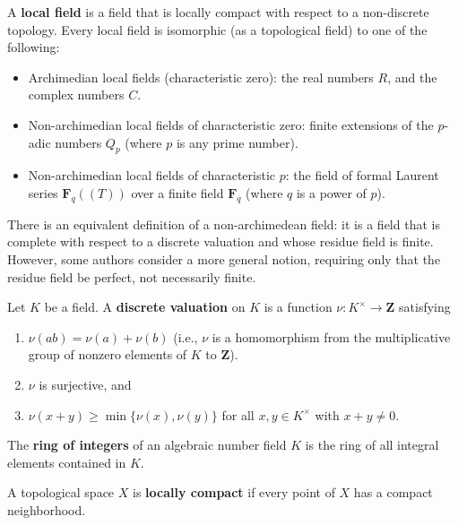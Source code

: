 \documentclass[11pt]{article}
\newenvironment{definition}[1][Definition]{\begin{trivlist}
\item[\hskip \labelsep {\bfseries #1}]}{\end{trivlist}}
\begin{document}
	
\begin{definition}
A \textbf{local field} is a field that is locally compact with respect to a non-discrete topology.
Every local field is isomorphic (as a topological field) to one of the following:
\begin{itemize}
	\item Archimedian local fields (characteristic zero): the real numbers $R$, and the complex numbers $C$.
	\item Non-archimedian local fields of characteristic zero: finite extensions of the $p$-adic numbers $Q_p$ (where $p$ is any prime number).
	\item Non-archimedian local fields of characteristic $p$: the field of formal Laurent series $\mathbf{F}_q((T))$ over a finite field $\mathbf{F}_q$
	(where $q$ is a power of $p$).
\end{itemize}
There is an equivalent definition of a non-archimedean field: it is a field that is complete with respect to a discrete valuation	 and whose residue field is finite.
However, some authors consider a more general notion, requiring only that the residue field be perfect, not necessarily finite.
\end{definition}

\begin{definition}
Let $K$ be a field. A \textbf{discrete valuation} on $K$ is a function $\nu: K^\times \to \mathbf{Z}$ satisfying
\begin{enumerate}
\item $\nu(ab) = \nu(a) + \nu(b)$ (i.e., $\nu$ is a homomorphism from the multiplicative group of nonzero elements of $K$ to $\mathbf{Z}$).
\item $\nu$ is surjective, and
\item $\nu(x+y) \ge \min \{\nu(x), \nu(y)\}$ for all $x, y \in K^\times$ with $x + y \ne 0$.
\end{enumerate}
\end{definition}

\begin{definition}
The \textbf{ring of integers} of an algebraic number field $K$ is the ring of all integral elements contained in $K$.
\end{definition}

\begin{definition}
A topological space $X$ is \textbf{locally compact} if every point of $X$ has a compact neighborhood.
\end{definition}
\end{document}
